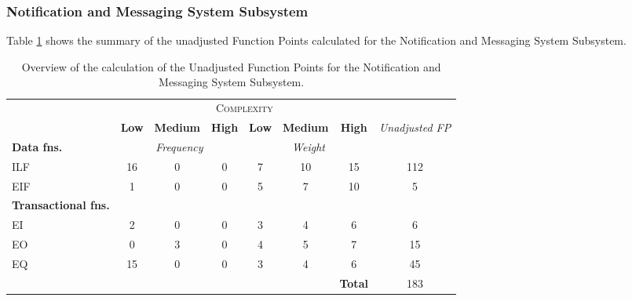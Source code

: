 \subsubsection{Notification and Messaging System Subsystem}
Table \ref{tbl_NMSS_UFP} shows the summary of the unadjusted Function Points calculated for the Notification and Messaging System Subsystem.
\begin{table}[hbtp]
\centering
\begin{tabular}{|l|c|c|c|c|c|c|c|}
\cline{2-7}
\multicolumn{1}{c}{} & \multicolumn{6}{|c|}{\textsc{Complexity}} & \multicolumn{1}{c}{}  \\ \cline{2-8}
\multicolumn{1}{c|}{} & \textbf{Low} & \textbf{Medium} & \textbf{High} & \textbf{Low} & \textbf{Medium} & \textbf{High} & \multirow{2}{*}{\textit{Unadjusted FP}} \\ \cline{1-7}
\textbf{Data fns.} & \multicolumn{3}{|c|}{\textit{Frequency}} &  \multicolumn{3}{|c|}{\textit{Weight}} & \\ \hline
ILF 	& 16 & 0 & 0 & 7 & 10 & 15 & 112 	\\ \hline
EIF 	& 1  & 0 & 0 & 5 & 7  & 10 & 5		\\ \hline
\textbf{Transactional fns.} & \multicolumn{7}{|c|}{} \\ \hline
EI 		& 2  & 0 & 0 & 3 & 4  & 6  & 6 		\\ \hline
EO 		& 0  & 3 & 0 & 4 & 5  & 7  & 15		\\ \hline
EQ		& 15 & 0 & 0 & 3 & 4  & 6  & 45		\\ \hline
\multicolumn{6}{c|}{} & \textbf{Total} & 183 \\ \cline{7-8}
\end{tabular}
\caption{Overview of the calculation of the Unadjusted Function Points for the Notification and Messaging System Subsystem.}
\label{tbl_NMSS_UFP}
\end{table}


